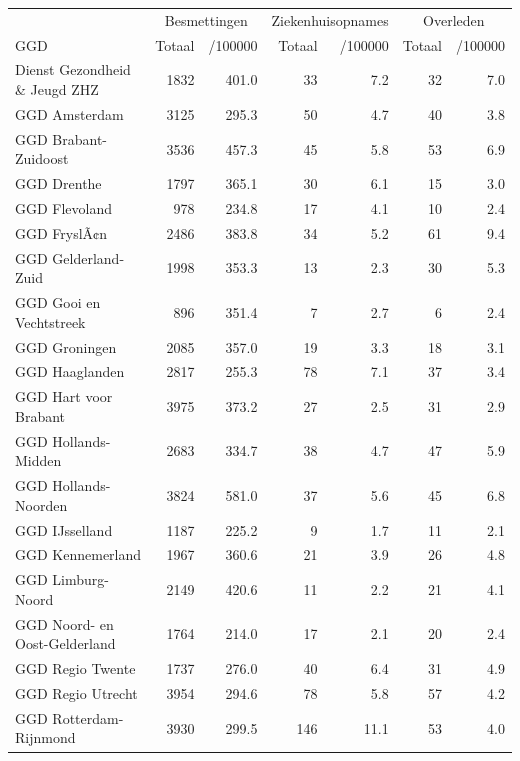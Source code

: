 \documentclass[
  english,
  man,floatsintext]{apa6}
\begin{document}
\begin{table}[H]
\centering\begingroup\fontsize{10}{12}\selectfont

\begin{threeparttable}
\begin{tabular}{lrrrrrr}
\toprule
\multicolumn{1}{c}{ } & \multicolumn{2}{c}{Besmettingen} & \multicolumn{2}{c}{Ziekenhuisopnames} & \multicolumn{2}{c}{Overleden} \\
\cmidrule(l{3pt}r{3pt}){2-3} \cmidrule(l{3pt}r{3pt}){4-5} \cmidrule(l{3pt}r{3pt}){6-7}
GGD & Totaal & /100000 & Totaal & /100000 & Totaal & /100000\\
\midrule
Dienst Gezondheid \& Jeugd ZHZ & 1832 & 401.0 & 33 & 7.2 & 32 & 7.0\\
GGD Amsterdam & 3125 & 295.3 & 50 & 4.7 & 40 & 3.8\\
GGD Brabant-Zuidoost & 3536 & 457.3 & 45 & 5.8 & 53 & 6.9\\
GGD Drenthe & 1797 & 365.1 & 30 & 6.1 & 15 & 3.0\\
GGD Flevoland & 978 & 234.8 & 17 & 4.1 & 10 & 2.4\\
GGD FryslÃ¢n & 2486 & 383.8 & 34 & 5.2 & 61 & 9.4\\
GGD Gelderland-Zuid & 1998 & 353.3 & 13 & 2.3 & 30 & 5.3\\
GGD Gooi en Vechtstreek & 896 & 351.4 & 7 & 2.7 & 6 & 2.4\\
GGD Groningen & 2085 & 357.0 & 19 & 3.3 & 18 & 3.1\\
GGD Haaglanden & 2817 & 255.3 & 78 & 7.1 & 37 & 3.4\\
GGD Hart voor Brabant & 3975 & 373.2 & 27 & 2.5 & 31 & 2.9\\
GGD Hollands-Midden & 2683 & 334.7 & 38 & 4.7 & 47 & 5.9\\
GGD Hollands-Noorden & 3824 & 581.0 & 37 & 5.6 & 45 & 6.8\\
GGD IJsselland & 1187 & 225.2 & 9 & 1.7 & 11 & 2.1\\
GGD Kennemerland & 1967 & 360.6 & 21 & 3.9 & 26 & 4.8\\
GGD Limburg-Noord & 2149 & 420.6 & 11 & 2.2 & 21 & 4.1\\
GGD Noord- en Oost-Gelderland & 1764 & 214.0 & 17 & 2.1 & 20 & 2.4\\
GGD Regio Twente & 1737 & 276.0 & 40 & 6.4 & 31 & 4.9\\
GGD Regio Utrecht & 3954 & 294.6 & 78 & 5.8 & 57 & 4.2\\
GGD Rotterdam-Rijnmond & 3930 & 299.5 & 146 & 11.1 & 53 & 4.0\\

\end{tabular}
\end{threeparttable}
\end{table}
\end{document}
